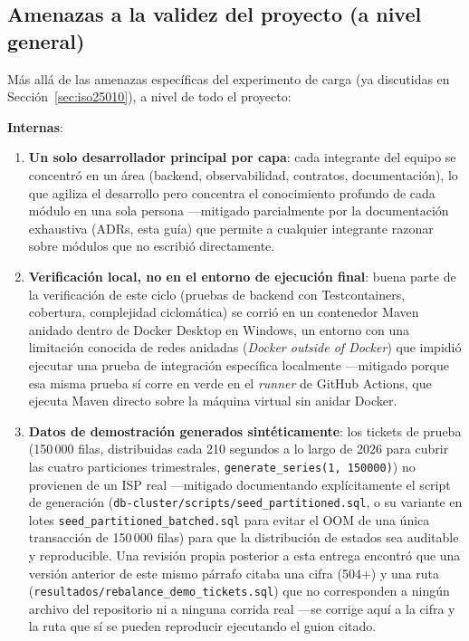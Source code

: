 \subsection{Amenazas a la validez del proyecto (a nivel general)}

Más allá de las amenazas específicas del experimento de carga (ya discutidas en
Sección~\ref{sec:iso25010}), a nivel de todo el proyecto:

\textbf{Internas}:
\begin{enumerate}[nosep]
  \item \textbf{Un solo desarrollador principal por capa}: cada integrante del equipo se
        concentró en un área (backend, observabilidad, contratos, documentación), lo que agiliza
        el desarrollo pero concentra el conocimiento profundo de cada módulo en una sola persona
        —mitigado parcialmente por la documentación exhaustiva (ADRs, esta guía) que permite a
        cualquier integrante razonar sobre módulos que no escribió directamente.
  \item \textbf{Verificación local, no en el entorno de ejecución final}: buena parte de la
        verificación de este ciclo (pruebas de backend con Testcontainers, cobertura, complejidad
        ciclomática) se corrió en un contenedor Maven anidado dentro de Docker Desktop en
        Windows, un entorno con una limitación conocida de redes anidadas (\emph{Docker outside
        of Docker}) que impidió ejecutar una prueba de integración específica localmente —mitigado
        porque esa misma prueba sí corre en verde en el \emph{runner} de GitHub Actions, que
        ejecuta Maven directo sobre la máquina virtual sin anidar Docker.
  \item \textbf{Datos de demostración generados sintéticamente}: los tickets de prueba (150\,000
        filas, distribuidas cada 210 segundos a lo largo de 2026 para cubrir las cuatro
        particiones trimestrales, \texttt{generate\_series(1, 150000)}) no provienen de un ISP
        real —mitigado documentando explícitamente el script de generación
        (\texttt{db-cluster/scripts/seed\_partitioned.sql}, o su variante en lotes
        \texttt{seed\_partitioned\_batched.sql} para evitar el OOM de una única transacción de
        150\,000 filas) para que la distribución de estados sea auditable y reproducible. Una
        revisión propia posterior a esta entrega encontró que una versión anterior de este mismo
        párrafo citaba una cifra (504+) y una ruta (\texttt{resultados/rebalance\_demo\_tickets.sql})
        que no corresponden a ningún archivo del repositorio ni a ninguna corrida real —se
        corrige aquí a la cifra y la ruta que sí se pueden reproducir ejecutando el guion citado.
\end{enumerate}

